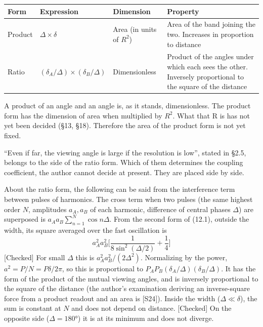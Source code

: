 \documentclass[
  a4paper,
]{article}
\newcounter{none} %
\begin{document}
{\def\LTcaptype{none} %
\begin{longtable}[]{@{}
  >{\raggedright\arraybackslash}p{}
  >{\raggedright\arraybackslash}p{}
  >{\raggedright\arraybackslash}p{}
  >{\raggedright\arraybackslash}p{}@{}}
\toprule\noalign{}
\begin{minipage}[b]{\linewidth}\raggedright
Form
\end{minipage} & \begin{minipage}[b]{\linewidth}\raggedright
Expression
\end{minipage} & \begin{minipage}[b]{\linewidth}\raggedright
Dimension
\end{minipage} & \begin{minipage}[b]{\linewidth}\raggedright
Property
\end{minipage} \\
\midrule\noalign{}
\endhead
\bottomrule\noalign{}
\endlastfoot
Product & \(\Delta\times\delta\) & Area (in units of \(R^2\)) & Area of
the band joining the two. Increases in proportion to distance \\
Ratio & \((\delta_A/\Delta)\times(\delta_B/\Delta)\) & Dimensionless &
Product of the angles under which each sees the other. Inversely
proportional to the square of the distance \\
\end{longtable}
}

A product of an angle and an angle is, as it stands, dimensionless. The
product form has the dimension of area when multiplied by \(R^2\). What
that R is has not yet been decided (§13, §18). Therefore the area of the
product form is not yet fixed.

``Even if far, the viewing angle is large if the resolution is low'',
stated in §2.5, belongs to the side of the ratio form. Which of them
determines the coupling coefficient, the author cannot decide at
present. They are placed side by side.

About the ratio form, the following can be said from the interference
term between pulses of harmonics. The cross term when two pulses (the
same highest order \(N\), amplitudes \(a_A, a_B\) of each harmonic,
difference of central phases \(\Delta\)) are superposed is
\(a_Aa_B\sum_{n=1}^N\cos n\Delta\). From the second form of (12.1),
outside the width, its square averaged over the fast oscillation is \[
a_A^2a_B^2\Big[\frac{1}{8\sin^2(\Delta/2)} + \frac14\Big] \tag{12.2}
\] {[}Checked{]} For small \(\Delta\) this is
\(a_A^2a_B^2/(2\Delta^2)\). Normalizing by the power,
\(a^2 = P/N = P\delta/2\pi\), so this is proportional to
\(P_AP_B(\delta_A/\Delta)(\delta_B/\Delta)\). It has the form of the
product of the mutual viewing angles, and is inversely proportional to
the square of the distance (the author's examination deriving an
inverse-square force from a product readout and an area is {[}S24{]}).
Inside the width (\(\Delta \ll \delta\)), the sum is constant at \(N\)
and does not depend on distance. {[}Checked{]} On the opposite side
(\(\Delta = 180°\)) it is at its minimum and does not diverge.
\end{document}
